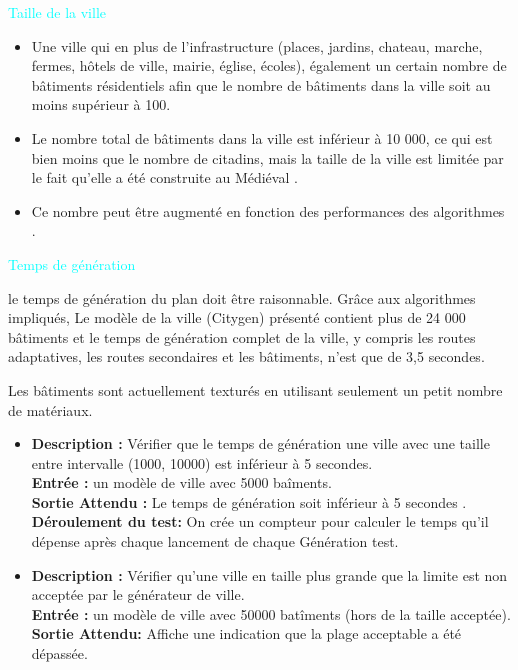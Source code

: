 \besoin{}
{\textcolor{cyan}{Taille de la ville }}
{ 
\begin{itemize}
  \item Une ville qui en plus de l'infrastructure (places, jardins, chateau, marche, fermes, hôtels de ville, mairie, église, écoles), également un certain nombre de bâtiments résidentiels afin que le nombre de bâtiments dans la ville soit au moins supérieur à 100.
 \item Le nombre total de bâtiments dans la ville est inférieur à 10 000,  ce qui est bien moins que le nombre de citadins, mais la taille de la ville est limitée par le fait qu'elle a été construite au Médiéval .
 
 \item Ce nombre peut être augmenté en fonction des performances des algorithmes .
 
\end{itemize}
}
{}
{}
\besoin{}
{\textcolor{cyan}{Temps de génération}}
{le temps de génération du plan  doit être raisonnable. Grâce aux algorithmes impliqués, Le modèle de la ville (Citygen) présenté contient plus de 24 000 bâtiments et le temps de génération complet de la ville, y compris les routes adaptatives, les routes secondaires et les bâtiments, n'est que de 3,5 secondes.

Les bâtiments sont actuellement texturés en utilisant seulement un petit nombre de matériaux.
}
{}
{
\begin{itemize}
 \item\textbf{ Description : } Vérifier que le temps de génération une ville avec une taille entre intervalle (1000, 10000)  est inférieur à 5 secondes.  \\
 \textbf{Entrée : } un modèle de ville avec 5000 baîments.  \\
 \textbf{Sortie Attendu : } Le temps de génération soit inférieur à 5 secondes . \\
 \textbf{Déroulement du test: } On crée un compteur pour calculer le temps qu’il dépense après chaque lancement de chaque Génération test. 
 
 \item\textbf{ Description : }  Vérifier qu'une ville en taille plus grande que la limite est non acceptée par le générateur de ville.  \\
 \textbf{Entrée : }  un modèle de ville avec 50000 batîments (hors de la taille acceptée).  \\
 \textbf{Sortie Attendu: } Affiche une indication que la plage acceptable a été dépassée. 
\end{itemize}
}
